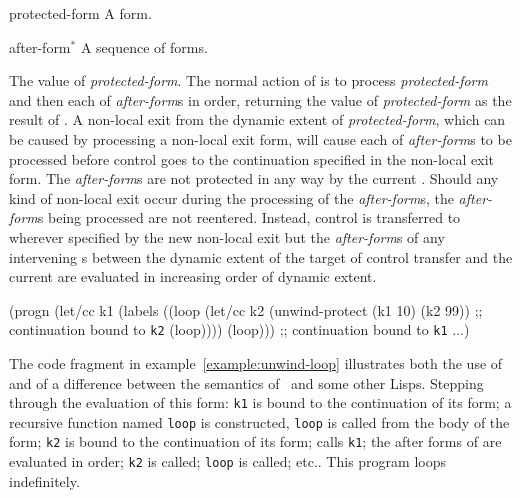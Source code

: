 \begin{optDefinition}
%
\Syntax
{}%
%
\begin{arguments}
    \item[protected-form] A form.
    \item[after-form$^*$] A sequence of forms.
\end{arguments}
%
\result%
The value of {\em protected-form}.
%
\remarks%
The normal action of  is to process {\em
    protected-form} and then each of {\em after-form}s in order, returning the
value of {\em protected-form} as the result of .  A
non-local exit from the dynamic extent of {\em protected-form}, which can be
caused by processing a non-local exit form, will cause each of {\em after-form}s
to be processed before control goes to the continuation specified in the
non-local exit form.  The {\em after-form}s are not protected in any way by the
current .  Should any kind of non-local exit occur
during the processing of the {\em after-form}s, the {\em after-form}s being
processed are not reentered.  Instead, control is transferred to wherever
specified by the new non-local exit but the {\em after-form}s of any intervening
s between the dynamic extent of the target of control
transfer and the current  are evaluated in increasing
order of dynamic extent.
%
\examples
%
\begin{example}
\label{example:unwind-loop}
{\syntax
(progn
  (let/cc k1
    (labels
      ((loop
         (let/cc k2 (unwind-protect (k1 10) (k2 99))
         ;; continuation bound to {\tt k2}
         (loop))))
      (loop)))
  ;; continuation bound to {\tt k1}
  ...)
\endsyntax}
\end{example}
%
The code fragment in example~\ref{example:unwind-loop} illustrates both the use
of  and of a difference between the semantics of
\eulisp\ and some other Lisps.  Stepping through the evaluation of this form:
{\tt k1} is bound to the continuation of its  form; a
recursive function named {\tt loop} is constructed, {\tt loop} is called from
the body of the  form; {\tt k2} is bound to the continuation
of its  form;  calls {\tt k1}; the
after forms of  are evaluated in order; {\tt k2} is
called; {\tt loop} is called; etc..  This program loops indefinitely.
%
\end{optDefinition}

